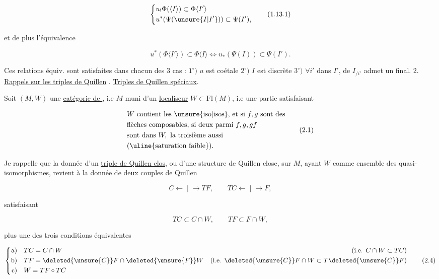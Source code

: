\[
\left\{\begin{aligned}
&u_!\Phi(\langle I\rangle)\subset\Phi\langle I'\rangle\\
&u^*(\Psi(\unsure{I|I'}))\subset\Psi(I'),
\end{aligned}\right.\tag*{(1.13.1)}
\]

et de plus l'équivalence

\[
u^*(\Phi\langle I'\rangle)\subset\Phi\langle I\rangle\Longleftrightarrow
u_*(\Psi(I))\subset\Psi(I').\tag*{(1.13.2)}
\]

Ces relations équiv. sont satisfaites dans chacun des 3 cas :
$1^\circ)$ $u$ est coétale
$2^\circ)$ $I$ est discrète
$3^\circ)$ $\forall i'$ dans $I'$,    de $I_{/i'}$ admet un  final.
2. \uline{Rappels sur les triples de Quillen} . \uline{ Triples de
Quillen spéciaux}.

Soit $(M,W)$ une \uline{catégorie de }, i.e
$M$ muni d'un \uline{localiseur} $W\subset\mathrm{Fl}(M)$, i.e une
partie satisfaisant

\[
\begin{aligned}
&W\text{ contient les \unsure{iso|isos}, et si }f,g\text{ sont des}\\
&\text{flèches composables, si deux parmi }f,g,gf\\
&\text{sont dans }W,\text{ la troisième aussi}\\
&\text{(\uline{saturation faible}).}
\end{aligned}\tag*{(2.1)}
\]

Je rappelle que la donnée d'un \uline{triple de
Quillen clos}, ou d'une structure de Quillen
close, sur $M$, ayant $W$ comme ensemble des
quasi-isomorphismes, revient à la donnée de
deux couples de Quillen

\[
C \mathrel{\longleftarrow\!\mid\!\longrightarrow} TF,\qquad TC \mathrel{\longleftarrow\!\mid\!\longrightarrow} F,\tag*{(2.2)}
\]

satisfaisant

\[
TC\subset C\cap W,\qquad TF\subset F\cap W,\tag*{(2.3)}
\]

plus une des trois conditions équivalentes

\[
\left\{\begin{aligned}
\text{a)}\quad &TC=C\cap W &(\text{i.e. } C\cap W\subset TC)\\
\text{b)}\quad &TF=\deleted{\unsure{C}}F\cap\deleted{\unsure{F}}W &(\text{i.e. }\deleted{\unsure{C}}F\cap W\subset T\deleted{\unsure{C}}F)\\
\text{c)}\quad &W=TF\circ TC
\end{aligned}\right.\tag*{(2.4)}
\]

